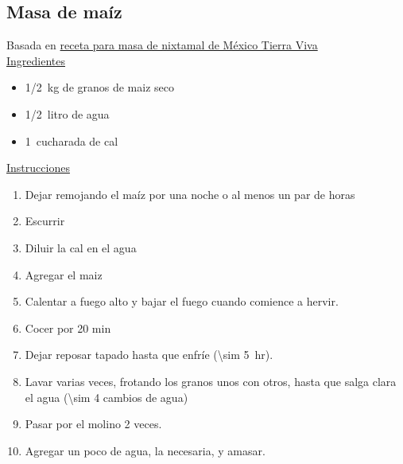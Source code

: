 \subsection{Masa de maíz}

Basada en \href{https://mexicotierraviva.org/con-maiz-masa-de-nixtamal/}{receta para masa de nixtamal de México Tierra Viva}\\

\underline{Ingredientes}
\begin{itemize}
\item \SI{1/2}{kg} de granos de maiz seco
\item \SI{1/2}{litro} de agua
\item \SI{1}{cucharada} de cal
\end{itemize}

\underline{Instrucciones}
\begin{enumerate}
\item Dejar remojando el maíz por una noche o al menos un par de horas
\item Escurrir
\item Diluir la cal en el agua
\item Agregar el maiz
\item Calentar a fuego alto y bajar el fuego cuando comience a hervir.
\item Cocer por 20 min
\item Dejar reposar tapado hasta que enfríe (\SI{\sim 5}{hr}).
\item Lavar varias veces, frotando los granos unos con otros, hasta que salga clara el agua (\num{\sim 4} cambios de agua)
\item Pasar por el molino 2 veces.
\item Agregar un poco de agua, la necesaria, y amasar.
\end{enumerate}

